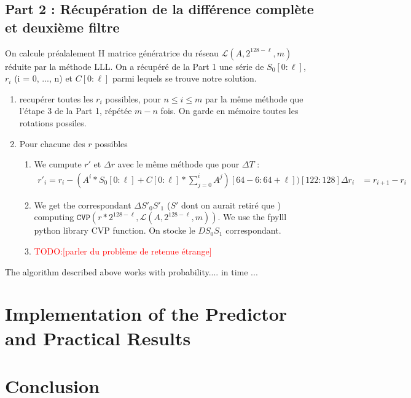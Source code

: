 \documentclass[preprint]{iacrtrans}
\newcommand{\todo}[1]{\textcolor{red}{TODO:[#1]}}
\begin{document}
\subsection{Part 2 : Récupération de la différence complète et deuxième filtre}
On calcule préalalement H matrice génératrice du réseau $\mathcal{L}(A,2^{128 - \ell},m)$ réduite par la méthode LLL.
On a récupéré de la Part 1 une série de $S_0[0 : \ell]$, $r_i$ (i = 0, ..., n) et $C[0 : \ell]$ parmi lequels se trouve notre solution.
\begin{enumerate}
  \item recupérer toutes les $r_i$ possibles, pour $n \leq i \leq m$  par la même méthode que l'étape 3 de la Part 1, répétée $m-n$ fois. On garde en mémoire toutes les rotations possiles.
  \item Pour chacune des $r$ possibles
  \begin{enumerate}
    \item We cumpute $r'$ et $\Delta r$ avec le même méthode que pour $\Delta T$ : 
    \begin{align}
      r'_i = r_i - (A^i*S_0[0 : \ell] + C[0 : \ell] * \sum_{j = 0}^i A^j)[64 - 6 : 64 + \ell])[122 : 128]
      \Delta r_i &= r_{i+1} - r_i
    \end{align}

    \item We get the correspondant $\Delta S'_0S'_1$ ($S'$ dont on aurait retiré que ) computing $\texttt{CVP}(r * 2^{128 - \ell}, \mathcal{L}(A,2^{128 - \ell},m))$. We use the fpylll python library CVP function. On stocke le $DS_0S_1$ correspondant.

    \item \todo{parler du problème de retenue étrange}
  \end{enumerate}
\end{enumerate}

\begin{theorem}
  The algorithm described above works with probability.... in time ...
\end{theorem}

\section{Implementation of the Predictor and Practical Results}

\section{Conclusion}




\end{document}
